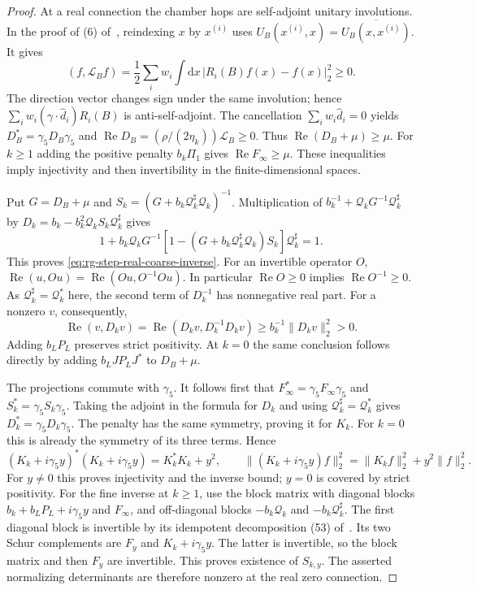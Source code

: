 \documentclass[11pt,letterpaper,reqno]{amsart}
\newcommand{\dd}{\mathrm d}
\newcommand{\exteq}[2]{(#1) of~\cite{#2}}
\begin{document}
\begin{proof}
At a real connection the chamber hops are self-adjoint
unitary involutions. In the proof of
\exteq{6}{FermionBlockManuscript}, reindexing $x$ by $x^{(i)}$
uses
$U_B(x^{(i)},x)=\overline{U_B(x,x^{(i)})}$.
It gives
\[
 (f,\mathcal L_Bf)=\frac12\sum_iw_i
                  \int\dd x\,|R_i(B)f(x)-f(x)|_2^2\ge0.
\]
The direction vector changes sign under the same
involution; hence
$\sum_iw_i(\gamma\cdot\widehat d_i)R_i(B)$
is anti-self-adjoint. The cancellation
$\sum_iw_i\widehat d_i=0$ yields
$D_B^*=\gamma_5D_B\gamma_5$ and
$\operatorname{Re}D_B=(\rho/(2\eta_k))\mathcal L_B\ge0$.
Thus $\operatorname{Re}(D_B+\mu)\ge\mu$.
For $k\ge1$ adding the positive penalty
$b_k\Pi_1$ gives $\operatorname{Re}F_\infty\ge\mu$.
These inequalities imply injectivity and then
invertibility in the finite-dimensional spaces.

Put $G=D_B+\mu$ and $S_k=(G+b_k\mathcal Q_k^\sharp
\mathcal Q_k)^{-1}$. Multiplication of
$b_k^{-1}+\mathcal Q_kG^{-1}\mathcal Q_k^\sharp$
by $D_k=b_k-b_k^2\mathcal Q_kS_k\mathcal Q_k^\sharp$
gives
\[
 1+b_k\mathcal Q_kG^{-1}
      [1-(G+b_k\mathcal Q_k^\sharp\mathcal Q_k)S_k]
                                               \mathcal Q_k^\sharp=1.
\]
This proves \eqref{eq:rg-step-real-coarse-inverse}.
For an invertible operator $O$,
$\operatorname{Re}(u,Ou)=
\operatorname{Re}(Ou,O^{-1}Ou)$.
In particular $\operatorname{Re}O\ge0$ implies
$\operatorname{Re}O^{-1}\ge0$.
As $\mathcal Q_k^\sharp=\mathcal Q_k^*$ here,
the second term of $D_k^{-1}$ has nonnegative real
part. For a nonzero $v$, consequently,
\[
 \operatorname{Re}(v,D_kv)
       =\operatorname{Re}(D_kv,D_k^{-1}D_kv)
                           \ge b_k^{-1}\|D_kv\|_2^2>0.
\]
Adding $b_LP_L$ preserves strict positivity.
At $k=0$ the same conclusion follows directly by
adding $b_LJP_LJ^*$ to $D_B+\mu$.

The projections commute with $\gamma_5$.
It follows first that
$F_\infty^*=\gamma_5F_\infty\gamma_5$ and
$S_k^*=\gamma_5S_k\gamma_5$.
Taking the adjoint in the formula for $D_k$ and using
$\mathcal Q_k^\sharp=\mathcal Q_k^*$ gives
$D_k^*=\gamma_5D_k\gamma_5$. The penalty has the
same symmetry, proving it for $K_k$.
For $k=0$ this is already the symmetry of its three
terms. Hence
\[
 (K_k+i\gamma_5y)^*(K_k+i\gamma_5y)
                                      =K_k^*K_k+y^2,
 \qquad
 \|(K_k+i\gamma_5y)f\|_2^2
                         =\|K_kf\|_2^2+y^2\|f\|_2^2.
\]
For $y\ne0$ this proves injectivity and the inverse
bound; $y=0$ is covered by strict positivity.
For the fine inverse at $k\ge1$, use the block
matrix with diagonal blocks
$b_k+b_LP_L+i\gamma_5y$ and $F_\infty$,
and off-diagonal blocks
$-b_k\mathcal Q_k$ and $-b_k\mathcal Q_k^\sharp$.
The first diagonal block is invertible by its
idempotent decomposition
\exteq{53}{FermionBlockManuscript}.
Its two Schur complements are $F_y$ and
$K_k+i\gamma_5y$. The latter is invertible,
so the block matrix and then $F_y$ are invertible.
This proves existence of $S_{k,y}$.
The asserted normalizing determinants are therefore
nonzero at the real zero connection.
\end{proof}
\end{document}
